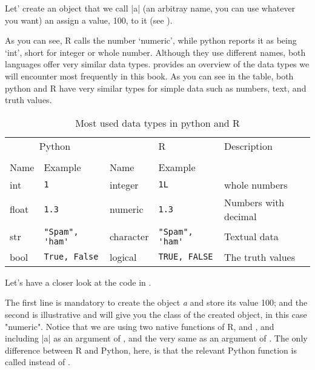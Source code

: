 Let' create an object that we call |a| (an arbitray name, you can use
whatever you want) an assign a value, 100, to it (see ).


As you can see, R calls the number `numeric', while python reports it
as being `int', short for integer or whole number.  Although they use
different names, both languages offer very similar data types.
 provides an overview of the data types we will
encounter most frequently in this book.  As you can see in the table,
both python and R have very similar types for simple data such as
numbers, text, and truth values.

\newcommand{\fndouble}{In R, double and numeric can generally be used
  interchangably (there is a subtle difference, but that is not
  relevant here).}

\begin{table}
  \begin{tabularx}{\textwidth}{lllll}
    \toprule
    \multicolumn{2}{c}{Python} & \multicolumn{2}{c}{R}& Description \\
    \cmidrule(lr){1-2}    \cmidrule(lr){3-4}\\
    Name & Example & Name & Example \\
    \midrule
    int   & \verb+1+             & integer   & \verb+1L+             & whole numbers \\
    float & \verb+1.3+           & numeric   & \verb+1.3+           & Numbers with decimal \\
    str   & \verb+"Spam", 'ham'+ & character & \verb+"Spam", 'ham'+ & Textual data  \\ 
    bool  & \verb+True, False+   & logical   & \verb+TRUE, FALSE+   & The truth values \\
    \bottomrule
  \end{tabularx}
  \caption{\label{tab:types}Most used data types in python and R}
\end{table}
    


Let's have a closer look at the code in .

The first line is mandatory to create the object \emph{a} and store
its value 100; and the second is illustrative and will give you the
class of the created object, in this case "numeric". Notice that we
are using two native functions of R,  and , and
including |a| as an argument of , and the very same
 as an argument of . The only difference
between R and Python, here, is that the relevant Python function is
called  instead of .

